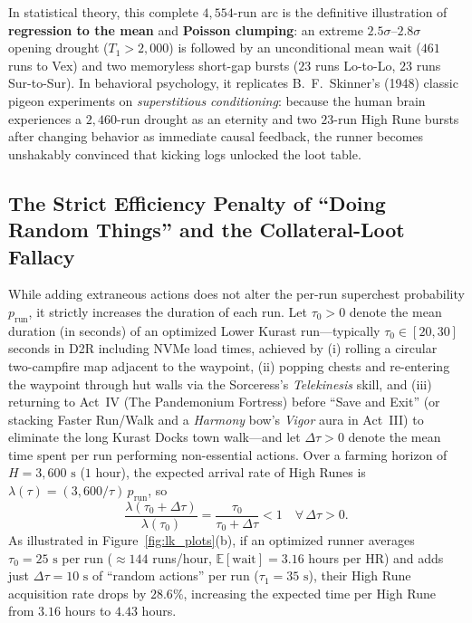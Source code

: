 \documentclass[11pt,reqno]{amsart}
\theoremstyle{definition}
\begin{document}
In statistical theory, this complete $4{,}554$-run arc is the definitive illustration of \textbf{regression to the mean} and \textbf{Poisson clumping}: an extreme $2.5\sigma$--$2.8\sigma$ opening drought ($T_1 > 2{,}000$) is followed by an unconditional mean wait ($461$ runs to Vex) and two memoryless short-gap bursts ($23$ runs Lo-to-Lo, $23$ runs Sur-to-Sur). In behavioral psychology, it replicates B.~F.~Skinner's (1948) classic pigeon experiments on \emph{superstitious conditioning}: because the human brain experiences a $2{,}460$-run drought as an eternity and two $23$-run High Rune bursts after changing behavior as immediate causal feedback, the runner becomes unshakably convinced that kicking logs unlocked the loot table.

\subsection{The Strict Efficiency Penalty of ``Doing Random Things'' and the Collateral-Loot Fallacy}
\label{subsec:collateral}

While adding extraneous actions does not alter the per-run superchest probability $p_{\text{run}}$, it strictly increases the duration of each run. Let $\tau_0 > 0$ denote the mean duration (in seconds) of an optimized Lower Kurast run—typically $\tau_0 \in [20, 30]$ seconds in D2R including NVMe load times, achieved by (i) rolling a circular two-campfire map adjacent to the waypoint, (ii) popping chests and re-entering the waypoint through hut walls via the Sorceress's \emph{Telekinesis} skill, and (iii) returning to Act~IV (The Pandemonium Fortress) before ``Save and Exit'' (or stacking Faster Run/Walk and a \emph{Harmony} bow's \emph{Vigor} aura in Act~III) to eliminate the long Kurast Docks town walk—and let $\Delta \tau > 0$ denote the mean time spent per run performing non-essential actions. Over a farming horizon of $H = 3{,}600\text{ s}$ ($1$ hour), the expected arrival rate of High Runes is $\lambda(\tau) = (3{,}600 / \tau)\, p_{\text{run}}$, so
\begin{equation}
\label{eq:rate_penalty}
    \frac{\lambda(\tau_0 + \Delta \tau)}{\lambda(\tau_0)} = \frac{\tau_0}{\tau_0 + \Delta \tau} < 1 \quad \forall\,\Delta \tau > 0.
\end{equation}
As illustrated in Figure~\ref{fig:lk_plots}(b), if an optimized runner averages $\tau_0 = 25\text{ s}$ per run ($\approx 144$ runs/hour, $\mathbb{E}[\text{wait}] = 3.16$ hours per HR) and adds just $\Delta \tau = 10\text{ s}$ of ``random actions'' per run ($\tau_1 = 35\text{ s}$), their High Rune acquisition rate drops by $28.6\%$, increasing the expected time per High Rune from $3.16$ hours to $4.43$ hours.
\end{document}
